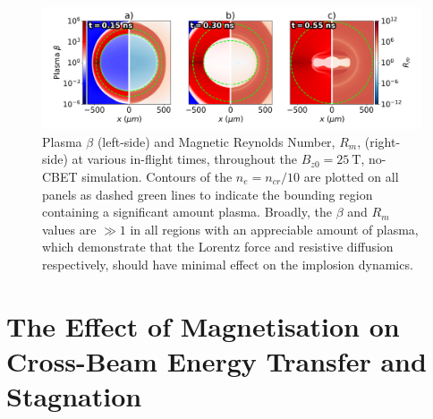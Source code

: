 \begin{figure}[t!]
    \includegraphics[width=\linewidth]{Results2/Images/magmag_beta_Rm.png}
    \centering
    \caption{Plasma $\beta$ (left-side) and Magnetic Reynolds Number, $R_m$, (right-side) at various in-flight times, throughout the $B_{z0}=25\ \text{T}$, no-\ac{CBET} simulation.
    Contours of the $n_e=n_{cr}/10$ are plotted on all panels as dashed green lines to indicate the bounding region containing a significant amount plasma.
    Broadly, the $\beta$ and $R_m$ values are $\gg 1$ in all regions with an appreciable amount of plasma, which demonstrate that the Lorentz force and resistive diffusion respectively, should have minimal effect on the implosion dynamics.}%
    \label{fig:Res2_magmag_beta_Rm}
\end{figure}



\section{The Effect of Magnetisation on Cross-Beam Energy Transfer and Stagnation}%
\label{sec:Res2_mag_on_CBET}

